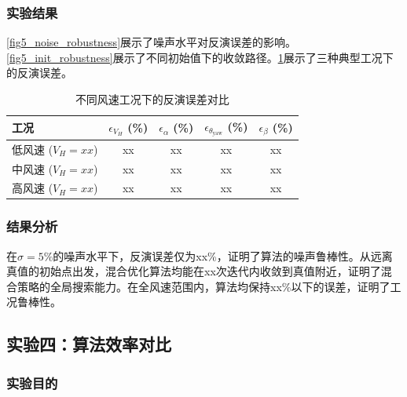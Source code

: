 \documentclass[withoutpreface,bwprint]{cumcmthesis}
\begin{document}
\subsubsection{实验结果}

\cref{fig5_noise_robustness}展示了噪声水平对反演误差的影响。\cref{fig5_init_robustness}展示了不同初始值下的收敛路径。\cref{tab5_工况_robustness}展示了三种典型工况下的反演误差。



\begin{table}[!ht]
\centering
\caption{不同风速工况下的反演误差对比}
\label{tab5_工况_robustness}
\begin{tabular}{lcccc}
\toprule
\textbf{工况} & $\epsilon_{V_H}$ (\%) & $\epsilon_{\alpha}$ (\%) & $\epsilon_{\theta_{\mathrm{yaw}}}$ (\%) & $\epsilon_{\beta}$ (\%) \\
\midrule
低风速 ($V_H=xx$) & xx & xx & xx & xx \\
中风速 ($V_H=xx$) & xx & xx & xx & xx \\
高风速 ($V_H=xx$) & xx & xx & xx & xx \\
\bottomrule
\end{tabular}
\end{table}

\subsubsection{结果分析}

在$\sigma=5\%$的噪声水平下，反演误差仅为xx\%，证明了算法的噪声鲁棒性。从远离真值的初始点出发，混合优化算法均能在xx次迭代内收敛到真值附近，证明了混合策略的全局搜索能力。在全风速范围内，算法均保持xx\%以下的误差，证明了工况鲁棒性。

\subsection{实验四：算法效率对比}

\subsubsection{实验目的}
\end{document}

